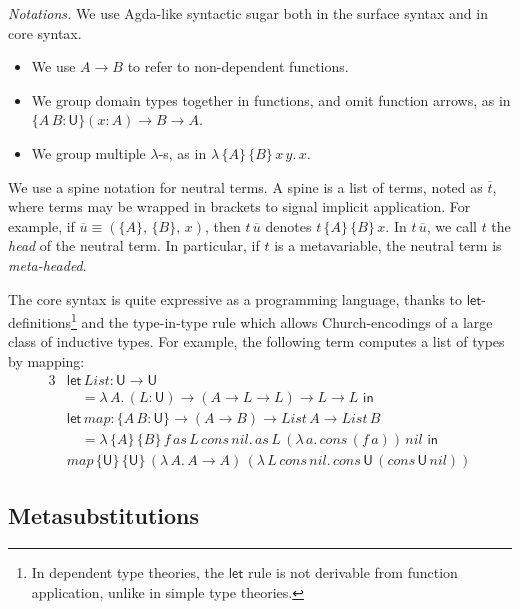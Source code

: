 \documentclass[acmsmall,review,anonymous,prologue,dvipsnames]{acmart}\settopmatter{printfolios=true,printccs=false,printacmref=false}
\newcommand{\slet}{\boldsymbol{\mathsf{let}}}
\renewcommand{\sin}{\boldsymbol{\mathsf{in}}}
\renewcommand{\U}{\mathsf{U}}
\theoremstyle{remark}
\begin{document}
\emph{Notations.} We use Agda-like syntactic sugar both in the surface syntax and
in core syntax.
\begin{itemize}
  \item We use $A \to B$ to refer to non-dependent functions.
  \item We group domain types together in functions, and omit function arrows,
    as in $\{A\,B : \U\}(x : A) \to B \to A$.
  \item We group multiple $\lambda$-s, as in $\lambda\,\{A\}\,\{B\}\,x\,y.\,x$.
\end{itemize}
\begin{definition}[Spines]\label{def:spines}
  We use a spine notation for neutral terms. A spine is a list of
  terms, noted as $\overline{t}$, where terms may be wrapped in brackets to
  signal implicit application. For example, if $\overline{u} \equiv
  (\{A\},\,\{B\},\,x)$, then $t\,\overline{u}$ denotes $t\,\{A\}\,\{B\}\,x$.  In
  $t\,\overline{u}$, we call $t$ the \emph{head} of the neutral term. In
  particular, if $t$ is a metavariable, the neutral term is \emph{meta-headed}.
\end{definition}
\begin{example}
The core syntax is quite expressive as a programming language, thanks to
$\slet$-definitions\footnote{In dependent type theories, the $\slet$ rule is not
  derivable from function application, unlike in simple type theories.} and the
type-in-type rule which allows Church-encodings of a large class of inductive
types. For example, the following term computes a list of types by mapping:
\begin{alignat*}{3}
  & \slet\,List : \U\to\U\\
  & \hspace{1em}= \lambda\,A.\,(L : \U)\to(A\to L\to L)\to L\to L\,\,\sin\\
  & \slet\,map : \{A\,B : \U\}\to (A \to B) \to List\,A \to List\,B\\
  & \hspace{1em}=
  \lambda\,\{A\}\,\{B\}\,f\,as\,L\,cons\,nil.\,as\,L\,(\lambda\,a.\,cons\,(f\,a))\,nil\,\,\sin\\
  & map\,\{\U\}\,\{\U\}\,(\lambda\,A.\, A \to A)\,(\lambda\,L\,cons\,nil.\,cons\,\U\,(cons\,\U\,nil))
\end{alignat*}
\end{example}

\subsection{Metasubstitutions}\label{sec:metasubstitutions}
\end{document}
